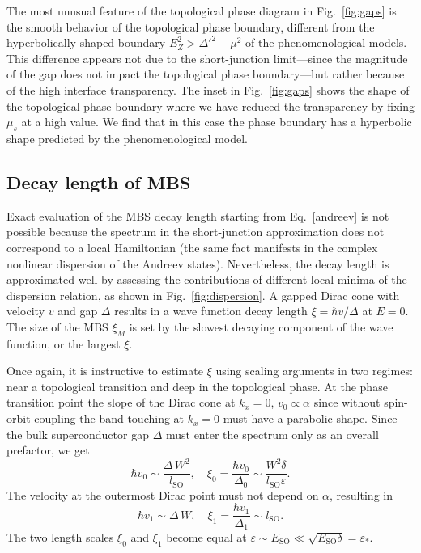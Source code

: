 The most unusual feature of the topological phase diagram in Fig.~\ref{fig:gaps} is the smooth behavior of the topological phase boundary, different from the hyperbolically-shaped boundary $E_Z^2 > \Delta'^2 + \mu^2$ of the phenomenological models\cite{Lutchyn2010,Oreg2010,Lutchyn2011}.
This difference appears not due to the short-junction limit---since the magnitude of the gap does not impact the topological phase boundary---but rather because of the high interface transparency.
The inset in Fig.~\ref{fig:gaps} shows the shape of the topological phase boundary where we have reduced the transparency by fixing $\mu_s$ at a high value.
We find that in this case the phase boundary has a hyperbolic shape predicted by the phenomenological model.

\subsection{Decay length of MBS}

Exact evaluation of the MBS decay length starting from Eq.~\eqref{andreev} is not possible because the spectrum in the short-junction approximation does not correspond to a local Hamiltonian (the same fact manifests in the complex nonlinear dispersion of the Andreev states).
Nevertheless, the decay length is approximated well by assessing the contributions of different local minima of the dispersion relation, as shown in Fig.~\ref{fig:dispersion}.
A gapped Dirac cone with velocity $v$ and gap $\Delta$ results in a wave function decay length $\xi = \hbar v/\Delta$ at $E=0$.
The size of the MBS $\xi_M$ is set by the slowest decaying component of the wave function, or the largest $\xi$.

Once again, it is instructive to estimate $\xi$ using scaling arguments in two regimes: near a topological transition and deep in the topological phase.
At the phase transition point the slope of the Dirac cone at $k_x=0$, $v_0 \propto \alpha$ since without spin-orbit coupling the band touching at $k_x = 0$ must have a parabolic shape.
Since the bulk superconductor gap $\Delta$ must enter the spectrum only as an overall prefactor, we get
\begin{equation}\label{eq:v_k_0}
\hbar v_0 \sim \frac{\Delta\, W^2}{ l_\textrm{SO}},
\quad \xi_0 = \frac{\hbar v_0}{\Delta_0} \sim \frac{W^2 \delta}{l_\textrm{SO}\varepsilon}.
\end{equation}
The velocity at the outermost Dirac point must not depend on $\alpha$, resulting in
\begin{equation}\label{eq:v_k_f}
\hbar v_1 \sim \Delta\, W,
\quad \xi_1 = \frac{\hbar v_1}{\Delta_1} \sim l_\textrm{SO}.
\end{equation}
The two length scales $\xi_0$ and $\xi_1$ become equal at $\varepsilon \sim E_\textrm{SO} \ll \sqrt{E_\textrm{SO} \delta} = \varepsilon_*$.

